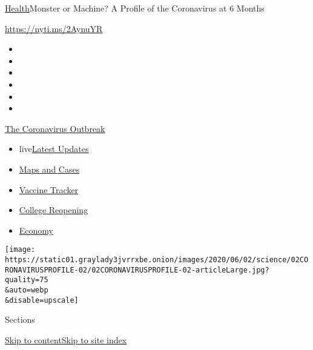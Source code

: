 \href{/section/health}{Health}\textbar{}Monster or Machine? A Profile of
the Coronavirus at 6 Months

\url{https://nyti.ms/2AynuYR}

\begin{itemize}
\item
\item
\item
\item
\item
\item
\end{itemize}

\href{https://www.nytimes3xbfgragh.onion/news-event/coronavirus?action=click\&pgtype=Article\&state=default\&region=TOP_BANNER\&context=storylines_menu}{The
Coronavirus Outbreak}

\begin{itemize}
\tightlist
\item
  live\href{https://www.nytimes3xbfgragh.onion/2020/08/04/world/coronavirus-cases.html?action=click\&pgtype=Article\&state=default\&region=TOP_BANNER\&context=storylines_menu}{Latest
  Updates}
\item
  \href{https://www.nytimes3xbfgragh.onion/interactive/2020/us/coronavirus-us-cases.html?action=click\&pgtype=Article\&state=default\&region=TOP_BANNER\&context=storylines_menu}{Maps
  and Cases}
\item
  \href{https://www.nytimes3xbfgragh.onion/interactive/2020/science/coronavirus-vaccine-tracker.html?action=click\&pgtype=Article\&state=default\&region=TOP_BANNER\&context=storylines_menu}{Vaccine
  Tracker}
\item
  \href{https://www.nytimes3xbfgragh.onion/2020/08/02/us/covid-college-reopening.html?action=click\&pgtype=Article\&state=default\&region=TOP_BANNER\&context=storylines_menu}{College
  Reopening}
\item
  \href{https://www.nytimes3xbfgragh.onion/live/2020/08/04/business/stock-market-today-coronavirus?action=click\&pgtype=Article\&state=default\&region=TOP_BANNER\&context=storylines_menu}{Economy}
\end{itemize}

\texttt{[image: https://static01.graylady3jvrrxbe.onion/images/2020/06/02/science/02CORONAVIRUSPROFILE-02/02CORONAVIRUSPROFILE-02-articleLarge.jpg?quality=75\\\&auto=webp\\\&disable=upscale]}

Sections

\protect\hyperlink{site-content}{Skip to
content}\protect\hyperlink{site-index}{Skip to site index}

